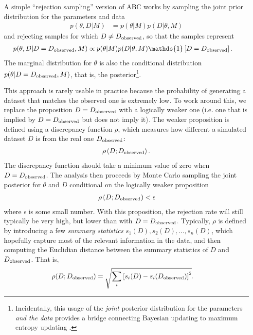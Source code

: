 \documentclass[article, nojss]{jss}
\begin{document}
A simple ``rejection sampling'' version of
ABC works by sampling the joint prior distribution for the parameters and
data
\begin{align}
p(\theta, D | M) &= p(\theta | M)p(D | \theta, M)
\end{align}
and rejecting samples for which $D \neq D_{\rm observed}$, so that the
samples represent
\begin{align}
p(\theta, D | D = D_{\rm observed}, M) &\propto p(\theta | M)p(D | \theta, M)
\mathds{1}\left[D = D_{\rm observed}\right].\label{eqn:abc_posterior}
\end{align}
The marginal distribution for $\theta$ is also the conditional distribution
$p(\theta | D = D_{\rm observed}, M)$, that is,
the posterior\footnote{Incidentally, this usage of the {\em joint} posterior
distribution for the parameters {\em and the data} provides a bridge
connecting Bayesian updating to maximum entropy updating
\citep{caticha2006updating,giffin2007updating}.}.

This approach is rarely usable in practice because the probability of
generating a dataset that matches the observed one is extremely low.
To work around this, we replace the proposition
$D = D_{\rm observed}$ with a logically
weaker one (i.e. one that is implied by $D = D_{\rm observed}$ but does not
imply it).
The weaker proposition is defined using
a discrepancy function
$\rho$, which measures how different a simulated dataset $D$ is from
the real one $D_{\rm observed}$:
\begin{align}
\rho\left(D; D_{\rm observed}\right).
\end{align}
The discrepancy function should take a minimum value of zero when
$D = D_{\rm observed}$.
The analysis then proceeds by Monte Carlo sampling the
joint posterior for $\theta$ and $D$
conditional on the logically weaker proposition
\begin{align}
\rho\left(D; D_{\rm observed}\right) < \epsilon
\end{align}
where $\epsilon$ is some small number. With this proposition, the
rejection rate will still
typically be very high, but lower than with $D = D_{\rm observed}$.
Typically, $\rho$ is defined by introducing a few {\em summary statistics}
$s_1(D), s_2(D), ..., s_n(D)$, which hopefully capture most of the relevant
information in the data, and then computing the Euclidian distance
between the summary statistics of $D$ and $D_{\rm observed}$.
That is,
\begin{align}
\rho(D; D_{\rm observed}) &=
\sqrt{\sum_i \left[s_i(D) - s_i(D_{\rm observed})\right]^2}.
\end{align}
\end{document}
